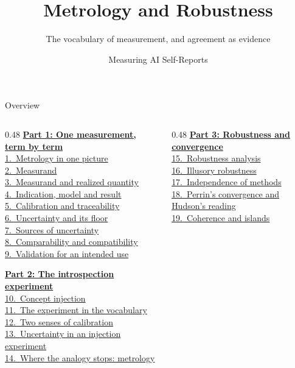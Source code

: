 \documentclass[aspectratio=169,11pt]{beamer}
\title{Metrology and Robustness}
\subtitle{The vocabulary of measurement, and agreement as evidence}
\author{Measuring AI Self-Reports}
\date{}
\institute{}
\begin{document}
\maketitle

\begin{frame}{Overview}\footnotesize
\begin{columns}[T]
\begin{column}{0.48\textwidth}
\hyperlink{part1}{\textbf{Part 1: One measurement, term by term}}\\[0.15em]
{\scriptsize%
\quad\hyperlink{picture}{1.~Metrology in one picture}\\%
\quad\hyperlink{measurand}{2.~Measurand}\\%
\quad\hyperlink{gaps}{3.~Measurand and realized quantity}\\%
\quad\hyperlink{indication}{4.~Indication, model and result}\\%
\quad\hyperlink{calibration}{5.~Calibration and traceability}\\%
\quad\hyperlink{uncertainty}{6.~Uncertainty and its floor}\\%
\quad\hyperlink{sources}{7.~Sources of uncertainty}\\%
\quad\hyperlink{compare}{8.~Comparability and compatibility}\\%
\quad\hyperlink{validation}{9.~Validation for an intended use}%
}\vspace{0.3em}

\hyperlink{part2}{\textbf{Part 2: The introspection experiment}}\\[0.15em]
{\scriptsize%
\quad\hyperlink{injection}{10.~Concept injection}\\%
\quad\hyperlink{mapping}{11.~The experiment in the vocabulary}\\%
\quad\hyperlink{twosenses}{12.~Two senses of calibration}\\%
\quad\hyperlink{llmunc}{13.~Uncertainty in an injection experiment}\\%
\quad\hyperlink{limitsmet}{14.~Where the analogy stops: metrology}%
}
\end{column}
\begin{column}{0.48\textwidth}
\hyperlink{part3}{\textbf{Part 3: Robustness and convergence}}\\[0.15em]
{\scriptsize%
\quad\hyperlink{wimsatt}{15.~Robustness analysis}\\%
\quad\hyperlink{illusory}{16.~Illusory robustness}\\%
\quad\hyperlink{cf}{17.~Independence of methods}\\%
\quad\hyperlink{perrin}{18.~Perrin's convergence and Hudson's reading}\\%
\quad\hyperlink{islands}{19.~Coherence and islands}%
}\vspace{0.3em}


\end{column}
\end{columns}
\end{frame}
\end{document}

